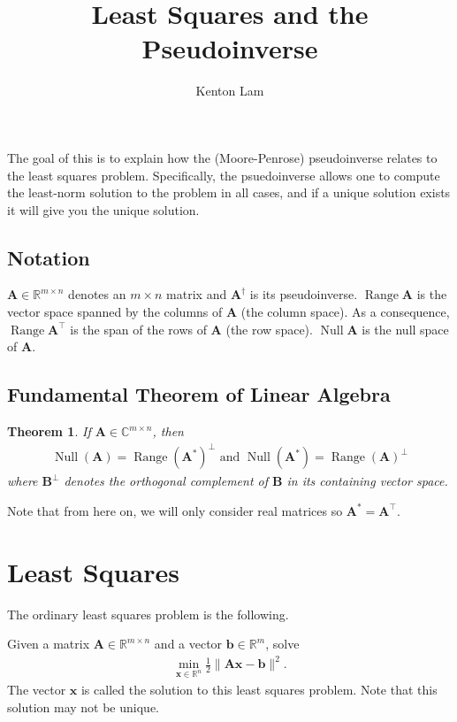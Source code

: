 \documentclass[12pt,a4paper]{article} %
\title{Least Squares and the Pseudoinverse}
\author{Kenton Lam}
\newtheorem*{theorem}{Theorem}
\DeclareMathOperator{\Range}{Range}
\DeclareMathOperator{\Null}{Null}
\begin{document}
\maketitle

The goal of this is to explain how the (Moore-Penrose) pseudoinverse relates 
to the least squares problem. Specifically, the psuedoinverse allows one to 
compute the least-norm solution to the problem in all cases, 
and if a unique solution exists it will give you the unique solution.

\subsection*{Notation}
$\mathbf A \in \mathbb R^{m \times n}$ denotes an $m \times n$ matrix 
and $\mathbf A^\dagger$ is its pseudoinverse. $\Range \mathbf A$ is the vector space 
spanned by the columns of $\mathbf A$ (the column space). As a consequence, $\Range \mathbf A^\top$ is 
the span of the rows of $\mathbf A$ (the row space). $\Null \mathbf A$ is the null space of $\mathbf A$.

\subsection*{Fundamental Theorem of Linear Algebra}
\begin{theorem}
    If $\mathbf A \in \mathbb C^{m \times n}$, then 
    \begin{align*}
        \Null (\mathbf A) = \Range (\mathbf A^*)^\perp \text{ and }
        \Null (\mathbf A^*) = \Range(\mathbf A)^\perp
    \end{align*}
    where $\mathbf B^\perp$ denotes the orthogonal complement of $\mathbf B$ in its 
    containing vector space.
\end{theorem}
Note that from here on, we will only consider real matrices so $\mathbf A^* = \mathbf A^\top$.

\section{Least Squares}
The ordinary least squares problem is the following.

Given a matrix $\mathbf A \in \mathbb R^{m \times n}$ 
and a vector $\bm b \in \mathbb R^{m}$, solve
\begin{align*}
    \min_{\bm x \in \mathbb R^n} \frac{1}{2} \| \mathbf A \bm x - \bm b \| ^2.
\end{align*}
The vector $\bm x$ is called the solution to this least squares problem. Note that this 
solution may not be unique.
\end{document}
